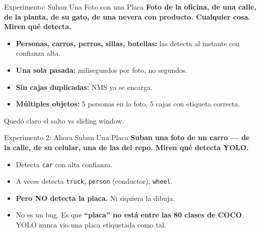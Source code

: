 \documentclass[aspectratio=169, 11pt]{beamer}
\begin{document}
\begin{frame}[shrink]{Experimento: Suban Una Foto con una Placa}
  \vspace{6pt}
  {\footnotesize\color{arcaDark}\bfseries
    Foto de la oficina, de una calle, de la planta, de su gato, de
    una nevera con producto. Cualquier cosa. Miren qu\'e detecta.}

  \vspace{14pt}
  {\footnotesize
  \begin{itemize}\setlength{\itemsep}{6pt}
    \item[{\color{codeGreen}\scriptsize\faCheck}]
      \textbf{Personas, carros, perros, sillas, botellas:} las detecta
      al instante con confianza alta.
    \item[{\color{codeGreen}\scriptsize\faCheck}]
      \textbf{Una sola pasada:} milisegundos por foto, no segundos.
    \item[{\color{codeGreen}\scriptsize\faCheck}]
      \textbf{Sin cajas duplicadas:} NMS ya se encarga.
    \item[{\color{codeGreen}\scriptsize\faCheck}]
      \textbf{M\'ultiples objetos:} 5 personas en la foto, 5 cajas con etiqueta correcta.
  \end{itemize}
  }

  \vspace{8pt}
  \begin{tcolorbox}[colback=codeGreen!8, colframe=codeGreen, boxrule=0.5pt,
    arc=2pt, left=6pt, right=6pt, top=4pt, bottom=4pt]
    {\scriptsize\color{arcaDark}
    \faKey\hspace{4pt} Qued\'o claro el salto vs sliding window.}
  \end{tcolorbox}
\end{frame}

\begin{frame}[shrink]{Experimento 2: Ahora Suban Una Placa}
  \vspace{6pt}
  {\footnotesize\color{arcaDark}\bfseries
    Suban una foto de un carro --- de la calle, de su celular,
    una de las del repo. Miren qu\'e detecta YOLO.}

  \vspace{14pt}
  {\footnotesize
  \begin{itemize}\setlength{\itemsep}{6pt}
    \item[{\color{codeGreen}\scriptsize\faCheck}]
      Detecta \texttt{car} con alta confianza.
    \item[{\color{codeGreen}\scriptsize\faCheck}]
      A veces detecta \texttt{truck}, \texttt{person} (conductor), \texttt{wheel}.
    \item[{\color{arcaRed}\scriptsize\faTimes}]
      \textbf{Pero NO detecta la placa.} Ni siquiera la dibuja.
    \item[{\color{arcaRed}\scriptsize\faTimes}]
      No es un bug. Es que \textbf{``placa'' no est\'a entre las 80 clases de COCO}.
      YOLO nunca vio una placa etiquetada como tal.
  \end{itemize}
  }
\end{frame}
\end{document}
